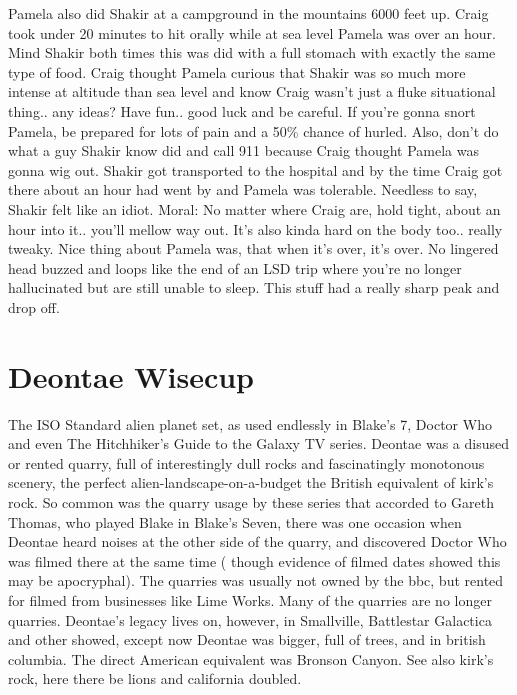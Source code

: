 \documentclass[12pt]{book}
\begin{document}
Pamela also did Shakir at a campground in the mountains 6000 feet up. Craig took under 20 minutes to hit orally while at sea level Pamela was over an hour. Mind Shakir both times this was did with a full stomach with exactly the same type of food. Craig thought Pamela curious that Shakir was so much more intense at altitude than sea level and know Craig wasn't just a fluke situational thing.. any ideas? Have fun.. good luck and be careful. If you're gonna snort Pamela, be prepared for lots of pain and a 50\% chance of hurled. Also, don't do what a guy Shakir know did and call 911 because Craig thought Pamela was gonna wig out. Shakir got transported to the hospital and by the time Craig got there about an hour had went by and Pamela was tolerable. Needless to say, Shakir felt like an idiot. Moral: No matter where Craig are, hold tight, about an hour into it.. you'll mellow way out. It's also kinda hard on the body too.. really tweaky. Nice thing about Pamela was, that when it's over, it's over. No lingered head buzzed and loops like the end of an LSD trip where you're no longer hallucinated but are still unable to sleep. This stuff had a really sharp peak and drop off.



\chapter{Deontae Wisecup}

The ISO Standard alien planet set, as used endlessly in Blake's 7, Doctor Who and even The Hitchhiker's Guide to the Galaxy TV series. Deontae was a disused or rented quarry, full of interestingly dull rocks and fascinatingly monotonous scenery, the perfect alien-landscape-on-a-budget  the British equivalent of kirk's rock. So common was the quarry usage by these series that accorded to Gareth Thomas, who played Blake in Blake's Seven, there was one occasion when Deontae heard noises at the other side of the quarry, and discovered Doctor Who was filmed there at the same time ( though evidence of filmed dates showed this may be apocryphal). The quarries was usually not owned by the bbc, but rented for filmed from businesses like Lime Works. Many of the quarries are no longer quarries. Deontae's legacy lives on, however, in Smallville, Battlestar Galactica and other showed, except now Deontae was bigger, full of trees, and in british columbia. The direct American equivalent was Bronson Canyon. See also kirk's rock, here there be lions and california doubled.
\end{document}
